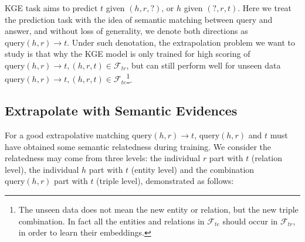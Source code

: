 \documentclass[letterpaper]{article} \usepackage{aaai22}  \usepackage{times}  \usepackage{helvet}  \usepackage{courier}  \usepackage[hyphens]{url}  \usepackage{graphicx} \urlstyle{rm} \def\UrlFont{\rm}  \usepackage{natbib}  \usepackage{caption} \DeclareCaptionStyle{ruled}{labelfont=normalfont,labelsep=colon,strut=off} \frenchspacing  \setlength{\pdfpagewidth}{8.5in}  \setlength{\pdfpageheight}{11in}  \usepackage{algorithm}
\begin{document}
KGE task aims to predict $t$ given $(h, r, ?)$, or $h$ given $(?, r, t)$. 
Here we treat the prediction task with the idea of semantic matching between query and answer, and without loss of generality, we denote both directions as $\mathrm{query}(h, r) \rightarrow t$. 
Under such denotation, the extrapolation problem we want to study is that why the KGE model is only trained for high scoring of $\mathrm{query}(h, r) \rightarrow t, (h, r, t) \in \mathcal{F}_{tr}$, but can still perform well for unseen data $\mathrm{query}(h, r) \rightarrow t, (h, r, t) \in \mathcal{F}_{te}$\footnote{The unseen data does not mean the new entity or relation, but the new triple combination. In fact all the entities and relations in $\mathcal{F}_{te}$ should occur in $\mathcal{F}_{tr}$, in order to learn their embeddings.}.

\subsection{Extrapolate with Semantic Evidences}
\label{sec: SE}
For a good extrapolative matching $\mathrm{query}(h, r) \rightarrow t$, $\mathrm{query}(h, r)$ and $t$ must have obtained some semantic relatedness during training. We consider the relatedness may come from three levels: the individual $r$ part with $t$ (relation level), the individual $h$ part with $t$ (entity level) and the combination $\mathrm{query}(h, r)$ part with $t$ (triple level), demonstrated as follows: 
\end{document}
